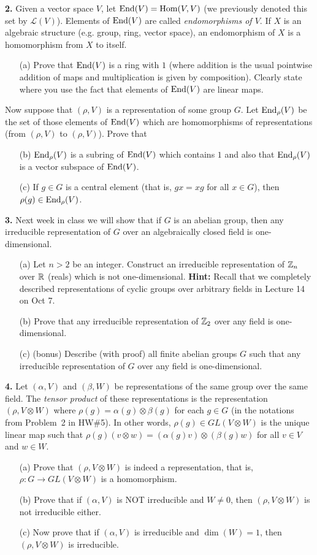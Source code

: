 \documentclass[12pt]{amsart}
\begin{document}
{\bf 2.} Given a vector space $V$, let $\mathrm {End}(V)=\mathrm {Hom}(V,V)$ (we previously denoted this set by $\mathcal L(V)$). Elements of $\mathrm {End}(V)$ are called
{\it endomorphisms of $V$}. If $X$ is an algebraic structure (e.g. group, ring, vector space), an endomorphism of $X$ is a homomorphism from $X$ to itself.
\begin{itemize}
\item[(a)] Prove that $\mathrm {End}(V)$ is a ring with $1$ (where addition is the usual pointwise addition of maps and multiplication is given by composition). Clearly state where you use the fact that elements of $\mathrm {End}(V)$ are linear maps.
\end{itemize}
Now suppose that $(\rho,V)$ is a representation of some group $G$. Let $\mathrm {End}_{\rho}(V)$ be the set of those elements of $\mathrm {End}(V)$ which are homomorphisms of representations (from $(\rho,V)$ to $(\rho,V)$). Prove that
\begin{itemize}
\item[(b)] $\mathrm {End}_{\rho}(V)$ is a subring of $\mathrm {End}(V)$ which contains $1$ and also that $\mathrm {End}_{\rho}(V)$ is a vector subspace of $\mathrm {End}(V)$.
\item[(c)] If $g\in G$ is a central element (that is, $gx=xg$ for all $x\in G$), then $\rho(g)\in \mathrm {End}_{\rho}(V)$.
\end{itemize}
\skv
{\bf 3.} Next week in class we will show that if $G$ is an abelian group, then any irreducible representation of $G$ over an algebraically closed field is one-dimensional. 
\begin{itemize}
\item[(a)] Let $n>2$ be an integer. Construct an irreducible representation of ${\mathbb Z}_n$ over ${\mathbb R}$ (reals) which is not one-dimensional. {\bf Hint:} Recall that we completely described representations of cyclic groups over arbitrary fields in Lecture 14 on Oct 7.
\item[(b)] Prove that any irreducible representation of ${\mathbb Z}_2$ over any field is one-dimensional.
\item[(c)] (bonus) Describe (with proof) all finite abelian groups $G$ such that any irreducible representation of $G$ over any field is one-dimensional.
\end{itemize}
\skv
{\bf 4.} Let $(\alpha,V)$ and $(\beta,W)$ be representations of the same group over the same field. The {\it tensor product} of these representations is the representation $(\rho, V\otimes W)$ where $\rho(g)=\alpha(g)\otimes \beta(g)$ for each $g\in G$ (in the notations
from Problem~2 in HW\#5). In other words, $\rho(g)\in GL(V\otimes W)$ is the unique linear map such that $\rho(g)(v\otimes w)=
(\alpha(g)v)\otimes (\beta(g)w)$ for all $v\in V$ and $w\in W$.
\begin{itemize}
\item[(a)] Prove that $(\rho, V\otimes W)$ is indeed a representation, that is, $\rho: G\to GL(V\otimes W)$ is a homomorphism.
\item[(b)] Prove that if $(\alpha,V)$ is NOT irreducible and $W\neq 0$, then $(\rho,V\otimes W)$ is not irreducible either.
\item[(c)] Now prove that if $(\alpha,V)$ is irreducible and $\dim(W)=1$, then $(\rho,V\otimes W)$ is irreducible.
\end{itemize}
\end{document}
